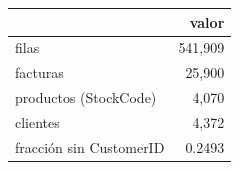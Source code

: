 \begin{tabular}{lr}
\toprule
 & valor \\
\midrule
filas & 541,909 \\
facturas & 25,900 \\
productos (StockCode) & 4,070 \\
clientes & 4,372 \\
fracción sin CustomerID & 0.2493 \\
\bottomrule
\end{tabular}
